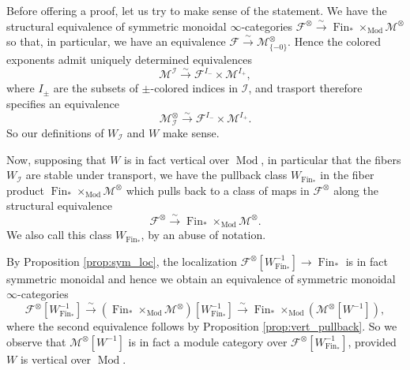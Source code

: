 \documentclass[reqno]{amsart}
\theoremstyle{definition}
\newcommand{\mcl}[1]{\mathcal{#1}}
\newcommand{\msc}[1]{\mathscr{#1}}
\newcommand{\opn}[1]{\operatorname{#1}}
\newcommand{\ot}{\otimes}
\DeclareMathOperator{\Fin}{Fin}
\renewcommand{\1}{\mathbf{1}}
\begin{document}
Before offering a proof, let us try to make sense of the statement.  We have the structural equivalence of symmetric monoidal $\infty$-categories $\msc{F}^{\ot}\overset{\sim}\to \Fin_{\ast}\times_{\opn{Mod}}\msc{M}^{\ot}$ so that, in particular, we have an equivalence $\msc{F}\overset{\sim}\to \msc{M}^{\ot}_{\{-0\}}$. Hence the colored exponents admit uniquely determined equivalences
\[
\msc{M}^{\mcl{I}}\overset{\sim}\to \msc{F}^{I_-}\times \msc{M}^{I_+},
\]
where $I_{\pm}$ are the subsets of $\pm$-colored indices in $\mcl{I}$, and trasport therefore specifies an equivalence
\[
\msc{M}^{\ot}_{\mcl{I}}\overset{\sim}\to \msc{F}^{I_-}\times\msc{M}^{I_+}.
\]
So our definitions of $W_{\mcl{I}}$ and $W$ make sense.
\par

Now, supposing that $W$ is in fact vertical over $\opn{Mod}$, in particular that the fibers $W_{\mcl{I}}$ are stable under transport, we have the pullback class $W_{\Fin_{\ast}}$ in the fiber product $\Fin_{\ast}\times_{\opn{Mod}}\msc{M}^{\ot}$ which pulls back to a class of maps in $\msc{F}^{\ot}$ along the structural equivalence
\[
\msc{F}^{\ot}\overset{\sim}\to \Fin_{\ast}\times_{\opn{Mod}}\msc{M}^{\ot}.
\]
We also call this class $W_{\Fin_{\ast}}$, by an abuse of notation.

By Proposition \ref{prop:sym_loc}, the localization $\msc{F}^{\ot}[W_{\Fin_{\ast}}^{-1}]\to \Fin_{\ast}$ is in fact symmetric monoidal and hence we obtain an equivalence of symmetric monoidal $\infty$-categories
\[
\msc{F}^{\ot}[W_{\opn{Fin}_{\ast}}^{-1}]\overset{\sim}\to (\Fin_{\ast}\times_{\opn{Mod}}\msc{M}^{\ot})[W_{\Fin_{\ast}}^{-1}]\overset{\sim}\to \Fin_{\ast}\times_{\opn{Mod}}(\msc{M}^{\ot}[W^{-1}]),
\]
where the second equivalence follows by Proposition \ref{prop:vert_pullback}.  So we observe that $\msc{M}^{\ot}[W^{-1}]$ is in fact a module category over $\msc{F}^{\ot}[W^{-1}_{\Fin_{\ast}}]$, provided $W$ is vertical over $\opn{Mod}$.
\end{document}
